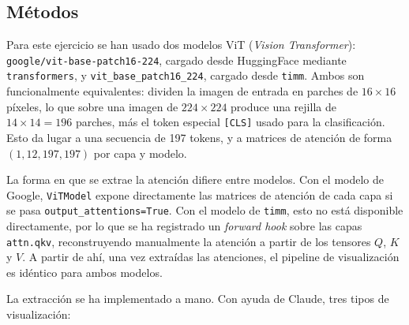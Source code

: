 \documentclass[11pt,spanish,listoffigures,listoftables]{tfgetsinf}
\begin{document}


\subsection{Métodos}

Para este ejercicio se han usado dos modelos ViT (\textit{Vision Transformer}): \texttt{google/vit-base-patch16-224}, cargado desde HuggingFace mediante \texttt{transformers}, y \texttt{vit\_base\_patch16\_224}, cargado desde \texttt{timm}. Ambos son funcionalmente equivalentes: dividen la imagen de entrada en parches de $16 \times 16$ píxeles, lo que sobre una imagen de $224 \times 224$ produce una rejilla de $14 \times 14 = 196$ parches, más el token especial \texttt{[CLS]} usado para la clasificación. Esto da lugar a una secuencia de 197 tokens, y a matrices de atención de forma $(1, 12, 197, 197)$ por capa y modelo.

La forma en que se extrae la atención difiere entre modelos. Con el modelo de Google, \texttt{ViTModel} expone directamente las matrices de atención de cada capa si se pasa \texttt{output\_attentions=True}. Con el modelo de \texttt{timm}, esto no está disponible directamente, por lo que se ha registrado un \textit{forward hook} sobre las capas \texttt{attn.qkv}, reconstruyendo manualmente la atención a partir de los tensores $Q$, $K$ y $V$. A partir de ahí, una vez extraídas las atenciones, el pipeline de visualización es idéntico para ambos modelos.

La extracción se ha implementado a mano. Con ayuda de Claude, tres tipos de visualización:
\end{document}
